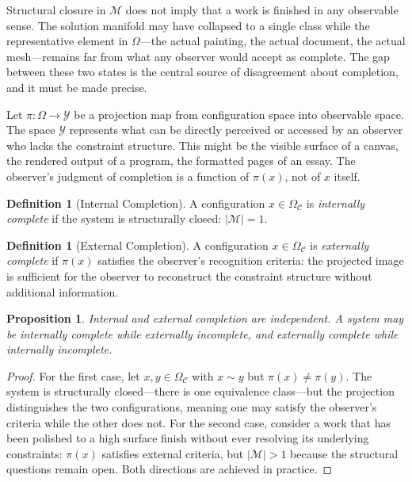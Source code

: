 \documentclass[11pt, twoside]{article}
\theoremstyle{plain}
\newtheorem{proposition}[theorem]{Proposition}
\theoremstyle{definition}
\newtheorem{definition}[theorem]{Definition}
\theoremstyle{remark}
\newcommand{\OmC}{\Omega_{\mathcal{C}}}
\begin{document}
Structural closure in $\mathcal{M}$ does not imply that a work is finished in any observable sense. The solution manifold may have collapsed to a single class while the representative element in $\Omega$---the actual painting, the actual document, the actual mesh---remains far from what any observer would accept as complete. The gap between these two states is the central source of disagreement about completion, and it must be made precise.

Let $\pi : \Omega \to \mathcal{Y}$ be a projection map from configuration space into observable space. The space $\mathcal{Y}$ represents what can be directly perceived or accessed by an observer who lacks the constraint structure. This might be the visible surface of a canvas, the rendered output of a program, the formatted pages of an essay. The observer's judgment of completion is a function of $\pi(x)$, not of $x$ itself.

\begin{definition}[Internal Completion]
A configuration $x \in \OmC$ is \emph{internally complete} if the system is structurally closed: $|\mathcal{M}| = 1$.
\end{definition}

\begin{definition}[External Completion]
A configuration $x \in \OmC$ is \emph{externally complete} if $\pi(x)$ satisfies the observer's recognition criteria: the projected image is sufficient for the observer to reconstruct the constraint structure without additional information.
\end{definition}

\begin{proposition}
\label{prop:noncoincidence}
Internal and external completion are independent. A system may be internally complete while externally incomplete, and externally complete while internally incomplete.
\end{proposition}

\begin{proof}
For the first case, let $x, y \in \OmC$ with $x \sim y$ but $\pi(x) \neq \pi(y)$. The system is structurally closed---there is one equivalence class---but the projection distinguishes the two configurations, meaning one may satisfy the observer's criteria while the other does not. For the second case, consider a work that has been polished to a high surface finish without ever resolving its underlying constraints: $\pi(x)$ satisfies external criteria, but $|\mathcal{M}| > 1$ because the structural questions remain open. Both directions are achieved in practice.
\end{proof}
\end{document}
